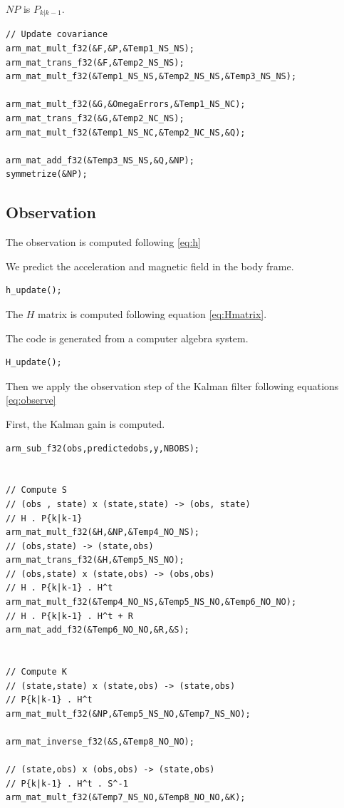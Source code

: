 \documentclass[titlepage,a4,12pt]{article}
\numberwithin{equation}{subsection}
\newcommand{\before}[1]{#1_{k|k-1}}
\begin{document}
$NP$ is $\before{P}$.

\begin{verbatim}
// Update covariance
arm_mat_mult_f32(&F,&P,&Temp1_NS_NS);
arm_mat_trans_f32(&F,&Temp2_NS_NS);
arm_mat_mult_f32(&Temp1_NS_NS,&Temp2_NS_NS,&Temp3_NS_NS);
  
arm_mat_mult_f32(&G,&OmegaErrors,&Temp1_NS_NC);
arm_mat_trans_f32(&G,&Temp2_NC_NS);
arm_mat_mult_f32(&Temp1_NS_NC,&Temp2_NC_NS,&Q);
  
arm_mat_add_f32(&Temp3_NS_NS,&Q,&NP);
symmetrize(&NP);

\end{verbatim}

\subsection{Observation}

The observation is computed following \ref{eq:h}

We predict the acceleration and magnetic field in the body frame.

\begin{verbatim}
h_update();
\end{verbatim}

The $H$ matrix is computed following equation \ref{eq:Hmatrix}.

The code is generated from a computer algebra system.

\begin{verbatim}
H_update();
\end{verbatim}

Then we apply the observation step of the Kalman filter following equations \ref{eq:observe}

First, the Kalman gain is computed.

\begin{verbatim}
arm_sub_f32(obs,predictedobs,y,NBOBS);


// Compute S
// (obs , state) x (state,state) -> (obs, state) 
// H . P{k|k-1}
arm_mat_mult_f32(&H,&NP,&Temp4_NO_NS);
// (obs,state) -> (state,obs)
arm_mat_trans_f32(&H,&Temp5_NS_NO);
// (obs,state) x (state,obs) -> (obs,obs)
// H . P{k|k-1} . H^t
arm_mat_mult_f32(&Temp4_NO_NS,&Temp5_NS_NO,&Temp6_NO_NO);
// H . P{k|k-1} . H^t + R
arm_mat_add_f32(&Temp6_NO_NO,&R,&S);
   

// Compute K 
// (state,state) x (state,obs) -> (state,obs)
// P{k|k-1} . H^t
arm_mat_mult_f32(&NP,&Temp5_NS_NO,&Temp7_NS_NO);

arm_mat_inverse_f32(&S,&Temp8_NO_NO);

// (state,obs) x (obs,obs) -> (state,obs)
// P{k|k-1} . H^t . S^-1
arm_mat_mult_f32(&Temp7_NS_NO,&Temp8_NO_NO,&K);
\end{verbatim}
\end{document}
